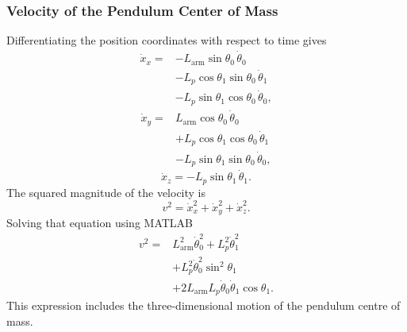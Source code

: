 \documentclass[a4paper,11pt]{article}
\newcommand{\La}{L_{\mathrm{arm}}}
\begin{document}
\subsubsection{Velocity of the Pendulum Center of Mass}
Differentiating the position coordinates with respect to time gives
\begin{equation}
\begin{aligned}
  \dot x_x = {}& -\La \sin\theta_0\,\dot\theta_0\\
  & - L_p \cos\theta_1 \sin\theta_0\,\dot\theta_1\\
  & - L_p \sin\theta_1 \cos\theta_0\,\dot\theta_0 ,
\end{aligned}
\end{equation}
\begin{equation}
\begin{aligned}
  \dot x_y = {}& \La \cos\theta_0\,\dot\theta_0\\
  & + L_p \cos\theta_1 \cos\theta_0\,\dot\theta_1\\
  & - L_p \sin\theta_1 \sin\theta_0\,\dot\theta_0 ,
\end{aligned}
\end{equation}
\begin{equation}
  \dot x_z = -L_p \sin\theta_1\,\dot\theta_1 .
\end{equation}
The squared magnitude of the velocity is
\begin{equation}
  v^2 = \dot x_x^2 + \dot x_y^2 + \dot x_z^2 .
\end{equation}
Solving that equation using MATLAB
\begin{equation}
\begin{aligned}
  v^2 = {}& \La^2 \dot\theta_0^2 + L_p^2 \dot\theta_1^2\\
  & + L_p^2 \dot\theta_0^2 \sin^2\theta_1\\
  & + 2 \La L_p \dot\theta_0 \dot\theta_1 \cos\theta_1 .
\end{aligned}
\label{eq:v2}
\end{equation}
This expression includes the three-dimensional motion of the pendulum centre of mass.
\end{document}
